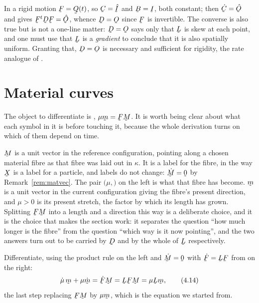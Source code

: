 \begin{remark}[$\bD=\Ob$ characterises rigidity]\label{rem:Drigid}
In a rigid motion $\bF=\bQ(t)$, so $\bC=\hI$ and $\bB=\I$, both constant;
then $\dot\bC=\hOb$ and  gives $\bF^{t}\bD\bF=\hOb$, whence
$\bD=\Ob$ since $\bF$ is invertible. The converse is also true but is not
a one-line matter: $\bD=\Ob$ says only that $\bL$ is skew at each point,
and one must use that $\bL$ is a \emph{gradient} to conclude that it is
also spatially uniform. Granting that, $\bD=\Ob$ is necessary and
sufficient for rigidity, the rate analogue of .
\end{remark}

\section{Material curves}\label{sec:matcurves}

The object to differentiate is , $\mu\bm=\bF\bM$. It is worth
being clear about what each symbol in it is before touching it, because
the whole derivation turns on which of them depend on time.

$\bM$ is a unit vector in the reference configuration, pointing along a
chosen material fibre as that fibre was laid out in $\kappa$. It is a
label for the fibre, in the way $\bX$ is a label for a particle, and
labels do not change: $\dot\bM=\bze$ by Remark~\ref{rem:matvec}. The pair
$(\mu,\bm)$ on the left is what that fibre has become. $\bm$ is a unit
vector in the current configuration giving the fibre's present direction,
and $\mu>0$ is its present stretch, the factor by which its length has
grown. Splitting $\bF\bM$ into a length and a direction this way is a
deliberate choice, and it is the choice that makes the section work: it
separates the question ``how much longer is the fibre'' from the question
``which way is it now pointing'', and the two answers turn out to be
carried by $\bD$ and by the whole of $\bL$ respectively.

Differentiate, using the product rule on the left and
$\dot\bM=\bze$ with $\dot\bF=\bL\bF$ from  on the right:
\begin{equation}
   \dot\mu\,\bm+\mu\dot\bm=\dot\bF\bM=\bL\bF\bM=\mu\bL\bm ,
   \tag{4.14}\label{eq:4.14}
\end{equation}
the last step replacing $\bF\bM$ by $\mu\bm$, which is the equation we
started from.

